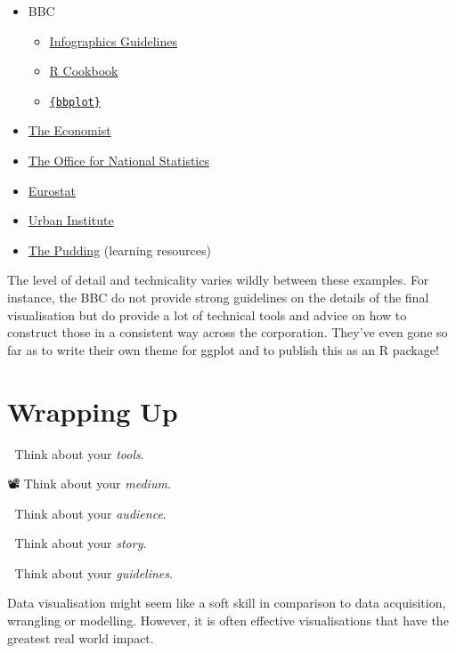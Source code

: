 \documentclass[
  letterpaper,
  DIV=11,
  numbers=noendperiod]{scrreprt}
\providecommand{\tightlist}{%
  \setlength{\itemsep}{0pt}\setlength{\parskip}{0pt}}\usepackage{longtable,booktabs,array}
\begin{document}
\begin{itemize}
\item
  BBC

  \begin{itemize}
  \tightlist
  \item
    \href{https://www.bbc.co.uk/gel/features/how-to-design-infographics}{Infographics
    Guidelines}
  \item
    \href{https://bbc.github.io/rcookbook/}{R Cookbook}
  \item
    \href{https://github.com/bbc/bbplot}{\texttt{\{bbplot\}}}
  \end{itemize}
\item
  \href{https://design-system.economist.com/documents/CHARTstyleguide_20170505.pdf}{The
  Economist}
\item
  \href{https://style.ons.gov.uk/category/data-visualisation/}{The
  Office for National Statistics}
\item
  \href{https://ec.europa.eu/eurostat/web/products-eurostat-news/-/STYLE-GUIDE_2016}{Eurostat}
\item
  \href{https://urbaninstitute.github.io/graphics-styleguide/}{Urban
  Institute}
\item
  \href{https://pudding.cool/resources/}{The Pudding} (learning
  resources)
\end{itemize}

The level of detail and technicality varies wildly between these
examples. For instance, the BBC do not provide strong guidelines on the
details of the final visualisation but do provide a lot of technical
tools and advice on how to construct those in a consistent way across
the corporation. They've even gone so far as to write their own theme
for ggplot and to publish this as an R package!

\section{Wrapping Up}\label{wrapping-up-4}

🔨 Think about your \emph{tools}.

📽 Think about your \emph{medium}.

👥 Think about your \emph{audience}.

📖 Think about your \emph{story}.

📝 Think about your \emph{guidelines}.

Data visualisation might seem like a soft skill in comparison to data
acquisition, wrangling or modelling. However, it is often effective
visualisations that have the greatest real world impact.
\end{document}
